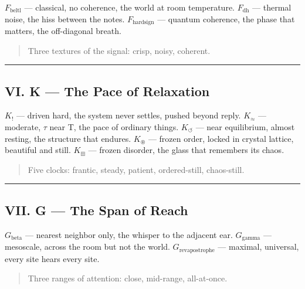 \documentclass[12pt,a4paper]{article}
\begin{document}
\emph{$F_{\text{beltl}}$} --- classical, no coherence, the world at room temperature.
\emph{$F_{\text{dh}}$} --- thermal noise, the hiss between the notes.
\emph{$F_{\text{hardsign}}$} --- quantum coherence, the phase that matters, the off-diagonal breath.

\begin{quote}
Three textures of the signal: crisp, noisy, coherent.

\end{quote}

\begin{center}
\rule{0.5\textwidth}{0.4pt}
\end{center}

\subsection{VI. K --- The Pace of Relaxation}

\emph{$K_{!}$} --- driven hard, the system never settles, pushed beyond reply.
\emph{$K_{\approx}$} --- moderate, $\tau$ near T, the pace of ordinary things.
\emph{$K_{\circlearrowleft}$} --- near equilibrium, almost resting, the structure that endures.
\emph{$K_{\circledast}$} --- frozen order, locked in crystal lattice, beautiful and still.
\emph{$K_{\boxplus}$} --- frozen disorder, the glass that remembers its chaos.

\begin{quote}
Five clocks: frantic, steady, patient, ordered-still, chaos-still.

\end{quote}

\begin{center}
\rule{0.5\textwidth}{0.4pt}
\end{center}

\subsection{VII. G --- The Span of Reach}

\emph{$G_{\text{beta}}$} --- nearest neighbor only, the whisper to the adjacent ear.
\emph{$G_{\text{gamma}}$} --- mesoscale, across the room but not the world.
\emph{$G_{\text{revapostrophe}}$} --- maximal, universal, every site hears every site.

\begin{quote}
Three ranges of attention: close, mid-range, all-at-once.

\end{quote}
\end{document}

